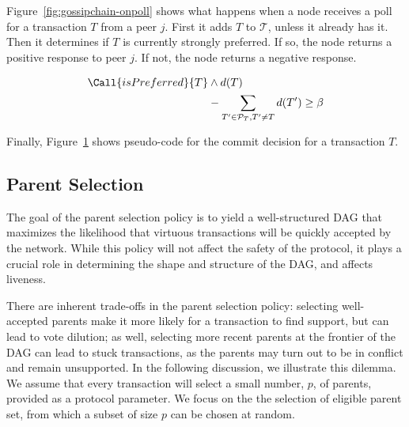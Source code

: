 Figure~\ref{fig:gossipchain-onpoll} shows what happens when a node
receives a poll for a transaction $T$ from a peer $j$.
First it adds $T$ to $\mathcal{T}$, unless it already has it.
Then it determines if $T$ is currently strongly preferred.
If so, the node returns a positive response to peer $j$.
If not, the node returns a negative response.

\begin{figure}
\begin{center}
\begin{algorithmic}[1]
    \small
        \State\Return
            \vspace*{-.8\baselineskip}
        \begin{align*}
            \Call{isPreferred}{T} &\land d(T) \\
            &- \sum_{T' \in \mathcal{P}_T, T' \neq T}{d(T')} \ge \beta
        \end{align*}
    \EndFunction
    \label{fig:gossipchain-diff-commit}
\end{algorithmic}
\end{center}
\end{figure}

Finally, Figure~\ref{fig:gossipchain-diff-commit} shows pseudo-code for
the commit decision for a transaction $T$.

\subsection{Parent Selection}
\label{sec:parent}

The goal of the parent selection policy is to yield a well-structured DAG that maximizes
the likelihood that virtuous transactions will be quickly accepted by the network. While this
policy will not affect the safety of the protocol, it plays a crucial role in determining
the shape and structure of the DAG, and affects liveness.

There are inherent trade-offs in the parent selection policy: selecting well-accepted parents make it
more likely for a transaction to find support, but can lead to vote dilution; as well, selecting more
recent parents at the frontier of the DAG can lead to stuck transactions, as the parents may turn out
to be in conflict and remain unsupported.  In the following discussion, we illustrate this dilemma.
We assume that every transaction will select a small number, $p$, of parents, provided as a protocol parameter.
We focus on the the selection of eligible parent set, from which a subset of size $p$ can be chosen at random.

